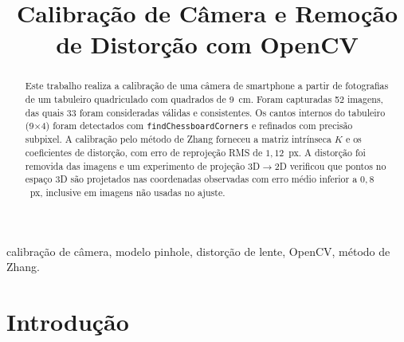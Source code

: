 \documentclass[conference]{IEEEtran}
\begin{document}
\title{Calibração de Câmera e Remoção de Distorção com OpenCV}

\author{
    \vspace{0.2cm}
}

\maketitle

\begin{abstract}
Este trabalho realiza a calibração de uma câmera de smartphone a partir de
fotografias de um tabuleiro quadriculado com quadrados de 9~cm. Foram
capturadas 52 imagens, das quais 33 foram consideradas válidas e
consistentes. Os cantos internos do tabuleiro (9$\times$4) foram detectados
com \texttt{findChessboardCorners} e refinados com precisão subpixel. A
calibração pelo método de Zhang forneceu a matriz intrínseca $K$ e os
coeficientes de distorção, com erro de reprojeção RMS de
$1{,}12$~px. A distorção foi removida das imagens e um experimento de
projeção 3D$\rightarrow$2D verificou que pontos no espaço 3D são
projetados nas coordenadas observadas com erro médio inferior a
$0{,}8$~px, inclusive em imagens não usadas no ajuste.
\end{abstract}

\begin{IEEEkeywords}
calibração de câmera, modelo pinhole, distorção de lente, OpenCV, método de Zhang.
\end{IEEEkeywords}

\section{Introdução}
\end{document}
